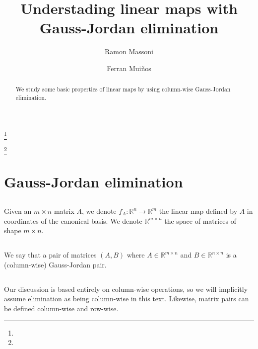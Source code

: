 \documentclass{proc-l}
\theoremstyle{definition}
\theoremstyle{remark}
\numberwithin{equation}{section}
\newcommand{\R}{\mathbb{R}}
\newcommand{\x}{\times}
\begin{document}
\title{Understading linear maps with Gauss-Jordan elimination}


\author{Ramon Massoni}
\address{}
\curraddr{}
\email{}
\thanks{}

\author{Ferran Mui\~nos}
\address{}
\curraddr{}
\email{}
\thanks{}





\begin{abstract}
We study some basic properties of linear maps by using column-wise Gauss-Jordan elimination.
\end{abstract}

\maketitle

\section{Gauss-Jordan elimination}
\subsection{}
Given an $m\x n$ matrix $A$, we denote $f_A:\R^n\to\R^m$ the linear map defined by $A$ in coordinates of the canonical basis. We denote $\R^{m \x n}$ the space of matrices of shape $m\x n$.

\subsection{}
We say that a pair of matrices $(A, B)$ where $A\in\R^{m\x n}$ and $B\in\R^{n\x n}$ is a (column-wise) Gauss-Jordan pair.

\subsection{}
Our discussion is based entirely on column-wise operations, so we will implicitly assume elimination as being column-wise in this text. Likewise, matrix pairs can be defined column-wise and row-wise.
\end{document}
